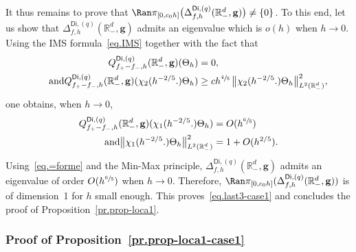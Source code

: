 \documentclass[JEP,XML,SOM,Unicode,NoEqCountersInSection,NoFloatCountersInSection,published]{cedram}
\newcommand{\mbf}[1]{\mathbf{#1}}
\theoremstyle{plain}
\theoremstyle{definition}
\begin{document}
It thus remains to prove that $\Ran \pi _{[0,c_0h]}\bigl(\Delta_{f,h}^{\mathsf{Di},(q)}(\mathbb R_-^d, \mbf g) \bigr) \neq \{0\}$. To this end, let us show that $\Delta_{f,h}^{\mathsf{Di},(q)}(\mathbb R_-^d, \mbf g)$ admits an eigenvalue which is $o(h)$ when $h\to 0$. Using the IMS formula~\eqref{eq.IMS} together with the fact that
\begin{align*}
Q_{f_+-f_-,h}^{\mathsf{Di},(q)}(\mathbb R_-^d, { \mbf g}) (\Theta_h)&=0,
\\
\tag*{and}
Q_{f_+-f_-,h}^{\mathsf{Di},(q)}(\mathbb R_-^d, { \mbf g}) (\chi_2(h^{-2/5 }.) \Theta_h) &\ge ch^{\sfrac 45}\, \big\Vert \chi_2(h^{-2/5 }.) \Theta_h\big\Vert_{L^2(\mathbb R_-^d)}^2,
\end{align*}
one obtains, when $h\to 0$,
\begin{align*}
Q_{f_+-f_-,h}^{\mathsf{Di},(q)}(\mathbb R_-^d, { \mbf g}) (\chi_1(h^{-2/5 }.) \Theta_h)&=O(h^{\sfrac 65})
\\
\tag*{and}
\big\Vert \chi_1(h^{-2/5 }.) \Theta_h\big\Vert_{L^2(\mathbb R_-^d)}^2&=1+O(h^{2/5 }).
\end{align*}
Using~\eqref{eq.=forme} and the Min-Max principle, $\Delta_{f,h}^{\mathsf{Di},(q)}(\mathbb R_-^d, \mbf g)$ admits an eigenvalue of order $O(h^{\sfrac 65})$ when $h\to 0$.
Therefore, $\Ran \pi_{[0,c_0h]}
(\Delta_{f,h}^{\mathsf{Di},(q)}(\mathbb R_-^d, \mbf g))$ is of
dimension~1 for $h$ small enough.
This proves~\eqref{eq.last3-case1} and concludes the proof of Proposition~\ref{pr.prop-loca1}.

\subsubsection{Proof of Proposition~\ref{pr.prop-loca1-case1}}\label{sec.prop-loca1-case1}
\end{document}
